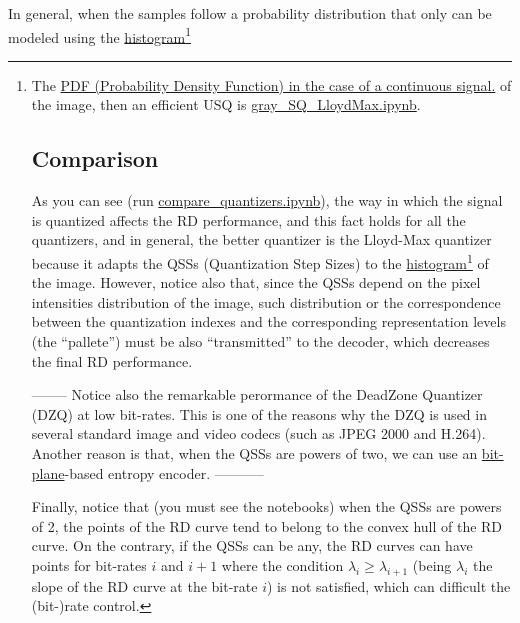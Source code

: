 In general, when the samples follow a probability distribution that
only can be modeled using the
\href{https://en.wikipedia.org/wiki/Histogram}{histogram}\footnote{The
\href{https://en.wikipedia.org/wiki/Probability_density_function}{PDF
  (Probability Density Function) in the case of a continuous signal.}
of the image, then an efficient USQ is
\href{https://github.com/Sistemas-Multimedia/Sistemas-Multimedia.github.io/blob/master/contents/gray_SQ/gray_SQ_LloydMax.ipynb}{gray\_SQ\_LloydMax.ipynb}.

\section{Comparison}
As you can see (run
\href{https://github.com/Sistemas-Multimedia/Sistemas-Multimedia.github.io/blob/master/contents/gray_SQ/compare_quantizers.ipynb}{compare\_quantizers.ipynb}),
the way in which the signal is quantized affects the RD performance,
and this fact holds for all the quantizers, and in general, the better
quantizer is the Lloyd-Max quantizer because it adapts the QSSs
(Quantization Step Sizes) to the
\href{https://en.wikipedia.org/wiki/Histogram}{histogram}\footnote{Or
\href{https://en.wikipedia.org/wiki/Probability_density_function}{PDF
  (Probability Density Function)} in the case of a continuous signal.}
of the image. However, notice also that, since the QSSs depend on the
pixel intensities distribution of the image, such distribution or the correspondence between the
quantization indexes and the corresponding representation levels (the
``pallete'') must be also ``transmitted'' to the decoder, which
decreases the final RD performance.

-------- Notice also the remarkable perormance of the DeadZone Quantizer (DZQ)
at low bit-rates. This is one of the reasons why the DZQ is used in
several standard image and video codecs (such as JPEG 2000 and
H.264). Another reason is that, when the QSSs are powers of two, we
can use an
\href{https://en.wikipedia.org/wiki/Bit_plane}{bit-plane}-based
entropy encoder. -----------

Finally, notice that (you must see the notebooks) when the QSSs are
powers of 2, the points of the RD curve tend to belong to the convex
hull of the RD curve. On the contrary, if the QSSs can be any, the RD
curves can have points for bit-rates $i$ and $i+1$ where the condition
$\lambda_i\ge\lambda_{i+1}$ (being $\lambda_i$ the slope of the RD
curve at the bit-rate $i$) is not satisfied, which can difficult the
(bit-)rate control.

}
